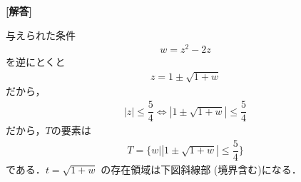 \documentclass[../../main.tex]{subfiles}
\begin{document}
\begin{oframed}
  
\end{oframed}

{\bf [解答]}

与えられた条件
\begin{align}
  w = z^2 - 2z
\end{align}
を逆にとくと
\begin{align}
  z = 1 \pm \sqrt{1+w} \label{eq:1}
\end{align}
だから，
\begin{align}
  |z| \le \dfrac{5}{4} \iff |1 \pm \sqrt{1+w}| \le \dfrac{5}{4} \label{eq:2}
\end{align}
だから，$T$の要素は
\begin{align}
  T = \bigg\{ w \bigg| |1 \pm \sqrt{1+w}| \le \dfrac{5}{4} \bigg\} \label{eq:3}
\end{align}
である．$t=\sqrt{1+w}$ の存在領域は下図斜線部 (境界含む)になる．
\end{document}
